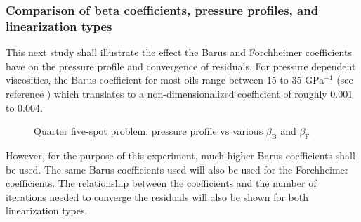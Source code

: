 \documentclass[11pt,reqno]{amsart}
\begin{document}
\subsubsection{Comparison of beta coefficients, pressure profiles, and linearization types}
This next study shall illustrate the effect the Barus and Forchheimer coefficients have on the 
pressure profile and convergence of residuals. For pressure dependent viscosities, the Barus 
coefficient for most oils range between 15 to 35 GPa$^{-1}$ (see reference \cite{G_Stachowiak}) 
which translates to a non-dimensionalized coefficient of roughly 0.001 to 0.004. 
\begin{figure}[t!]
  \centering
  \caption{Quarter five-spot problem: pressure profile vs various $\beta_{\mathrm{B}}$ and $\beta_{\mathrm{F}}$}
  \label{Fig:Quarter_spot_pressure_profile}
\end{figure}
However, for the purpose of this experiment, much higher Barus coefficients shall be used. 
The same Barus coefficients used will also be used for the Forchheimer coefficients. The 
relationship between the coefficients and the number of iterations needed to 
converge the residuals will also be shown for both linearization types.
\end{document}
